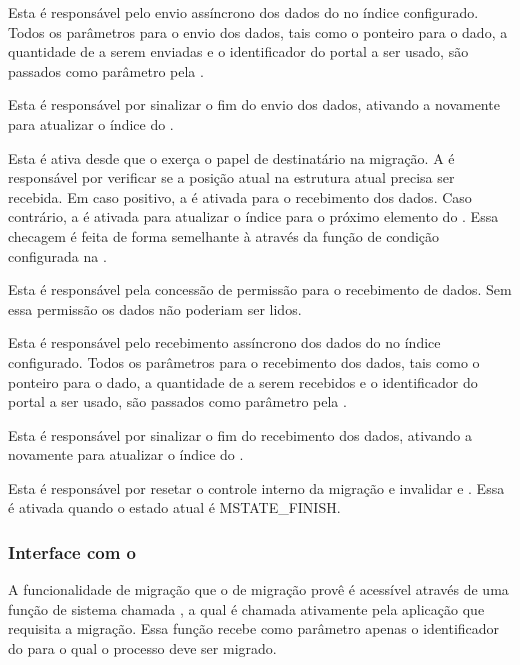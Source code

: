 \begin{description}[leftmargin=*,labelwidth=!,labelindent=0pt]
    \item[7.] Esta \task é responsável pelo envio assíncrono dos dados do \buffer no índice configurado. Todos os parâmetros para o envio dos dados, tais como o ponteiro para o dado, a quantidade de \bytes a serem enviadas e o identificador do portal a ser usado, são passados como parâmetro pela .
    \item[8.] Esta \task é responsável por sinalizar o fim do envio dos dados, ativando a  novamente para atualizar o índice do \buffer.
    \item[9.] Esta \task é ativa desde que o \cluster exerça o papel de destinatário na migração. A \task é responsável por verificar se a posição atual na estrutura atual precisa ser recebida. Em caso positivo, a  é ativada para o recebimento dos dados. Caso contrário, a  é ativada para atualizar o índice para o próximo elemento do \buffer. Essa checagem é feita de forma semelhante à  \ie através da função de condição configurada na .
    \item[10.] Esta \task é responsável pela concessão de permissão para o recebimento de dados. Sem essa permissão os dados não poderiam ser lidos.
    \item[11.] Esta \task é responsável pelo recebimento assíncrono dos dados do \buffer no índice configurado. Todos os parâmetros para o recebimento dos dados, tais como o ponteiro para o dado, a quantidade de \bytes a serem recebidos e o identificador do portal a ser usado, são passados como parâmetro pela .
    \item[12.] Esta \task é responsável por sinalizar o fim do recebimento dos dados, ativando a  novamente para atualizar o índice do \buffer.
    \item[13.] Esta \task é responsável por resetar o controle interno da migração e invalidar \tlbs e \caches. Essa \task é ativada quando o estado atual é MSTATE\_FINISH. 

\end{description}

\subsubsection{Interface com o \Daemon}

A funcionalidade de migração que o \daemon de migração provê é acessível através de uma função de sistema chamada \kmigrateto, a qual é chamada ativamente pela aplicação que requisita a migração. Essa função recebe como parâmetro apenas o identificador do \cluster para o qual o processo deve ser migrado.

